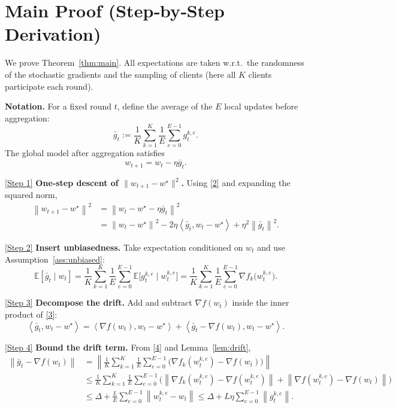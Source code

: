 \documentclass[11pt]{article}
\newcommand{\E}{\mathbb{E}}
\newcommand{\norm}[1]{\left\lVert#1\right\rVert}
\newcommand{\inner}[2]{\left\langle #1,#2\right\rangle}
\begin{document}
\section*{Main Proof (Step‑by‑Step Derivation)}
We prove Theorem~\ref{thm:main}.  
All expectations are taken w.r.t.\ the randomness of the stochastic gradients and the sampling of clients (here all $K$ clients participate each round).

\bigskip
\noindent\textbf{Notation.} For a fixed round $t$, define the average of the $E$ local updates before aggregation:
\[
\bar g_t:=\frac1{K}\sum_{k=1}^{K}\frac1E\sum_{e=0}^{E-1} g_{t}^{k,e}.
\]
The global model after aggregation satisfies
\[
w_{t+1}= w_t-\eta\bar g_t . \tag{2}
\]

\bigskip
\noindent\underline{[Step 1]} \textbf{One‑step descent of $\|w_{t+1}-w^\star\|^2$.}  
Using \eqref{2} and expanding the squared norm,
\[
\begin{aligned}
\norm{w_{t+1}-w^\star}^2
&=\norm{w_t-w^\star-\eta\bar g_t}^2\\
&=\norm{w_t-w^\star}^2-2\eta\inner{\bar g_t}{w_t-w^\star}
+\eta^2\norm{\bar g_t}^2 . \tag{3}
\end{aligned}
\]

\noindent\underline{[Step 2]} \textbf{Insert unbiasedness.}  
Take expectation conditioned on $w_t$ and use Assumption~\ref{ass:unbiased}:
\[
\E[\bar g_t\mid w_t]=\frac1{K}\sum_{k=1}^{K}\frac1E\sum_{e=0}^{E-1}
\E\!\big[g_{t}^{k,e}\mid w_{t}^{k,e}\big]
=\frac1{K}\sum_{k=1}^{K}\frac1E\sum_{e=0}^{E-1}
\nabla f_k\!\big(w_{t}^{k,e}\big). \tag{4}
\]

\noindent\underline{[Step 3]} \textbf{Decompose the drift.}  
Add and subtract $\nabla f(w_t)$ inside the inner product of \eqref{3}:
\[
\inner{\bar g_t}{w_t-w^\star}
=
\inner{\nabla f(w_t)}{w_t-w^\star}
+\inner{\bar g_t-\nabla f(w_t)}{w_t-w^\star}. \tag{5}
\]

\noindent\underline{[Step 4]} \textbf{Bound the drift term.}  
From \eqref{4} and Lemma~\ref{lem:drift},
\[
\begin{aligned}
\norm{\bar g_t-\nabla f(w_t)}
&=\norm{\frac1{K}\sum_{k=1}^{K}\frac1E\sum_{e=0}^{E-1}
\big(\nabla f_k(w_{t}^{k,e})-\nabla f(w_t)\big)}\\
&\le\frac1{K}\sum_{k=1}^{K}\frac1E\sum_{e=0}^{E-1}
\big(\norm{\nabla f_k(w_{t}^{k,e})-\nabla f(w_{t}^{k,e})}
+\norm{\nabla f(w_{t}^{k,e})-\nabla f(w_t)}\big)\\
&\le\Delta+\frac{L}{E}\sum_{e=0}^{E-1}\norm{w_{t}^{k,e}-w_t}
\le\Delta+L\eta\sum_{e=0}^{E-1}\norm{g_{t}^{k,e}} .
\end{aligned}
\tag{6}
\]
\end{document}
